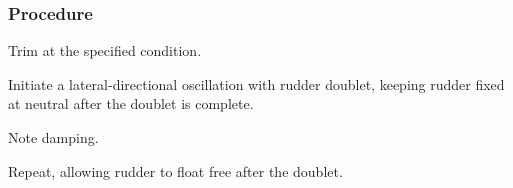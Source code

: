 % 
% 
%
 \subsubsection*{Procedure}
 \begin{compactenum}
    \item Trim at the specified condition.
    \item Initiate a lateral-directional oscillation with rudder doublet, keeping rudder fixed at neutral after the doublet is complete.
    \item Note damping.
    \item Repeat, allowing rudder to float free after the doublet.
    \end{compactenum}
